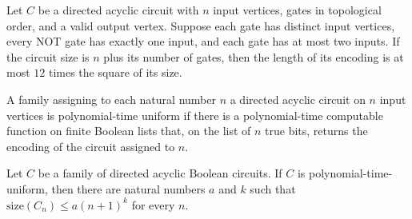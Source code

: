 \begin{theorem}
\label{BoolCircuit.DAGCircuit.length_encode_le_of_isFaninTwo}
\leanok
{}
Let $C$ be a directed acyclic circuit with $n$ input vertices, gates in topological
order, and a valid output vertex. Suppose each gate has distinct input vertices, every
NOT gate has exactly one input, and each gate has at most two inputs. If the circuit
size is $n$ plus its number of gates, then the length of its encoding is at most $12$
times the square of its size.
\end{theorem}

\begin{definition}
\label{BoolCircuit.DAGCircuitFamily.IsPUniform}
\leanok
{}
A family assigning to each natural number $n$ a directed acyclic circuit on $n$ input
vertices is polynomial-time uniform if there is a polynomial-time computable function on
finite Boolean lists that, on the list of $n$ true bits, returns the encoding of the
circuit assigned to $n$.
\end{definition}

\begin{theorem}
\label{BoolCircuit.DAGCircuitFamily.IsPUniform.isPolySize}
\leanok
{}
Let $C$ be a family of directed acyclic Boolean circuits. If $C$ is
polynomial-time-uniform, then there are natural numbers $a$ and $k$ such that
$\mathrm{size}(C_n)\leq a(n+1)^k$ for every $n$.
\end{theorem}

